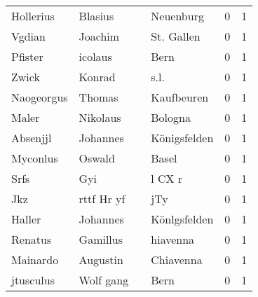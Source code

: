\begin{center}
\begin{tiny}
\begin{longtabu}{llllrr}
                Hollerius &                            Blasius &             &                                   Neuenburg &          0 &         1 \\
                   Vgdian &                            Joachim &             &                                  St. Gallen &          0 &         1 \\
                  Pfister &                            icolaus &             &                                        Bern &          0 &         1 \\
                    Zwick &                             Konrad &             &                                        s.l. &          0 &         1 \\
               Naogeorgus &                             Thomas &             &                                  Kaufbeuren &          0 &         1 \\
                    Maler &                           Nikolaus &             &                                     Bologna &          0 &         1 \\
                 Absenjjl &                           Johannes &             &                                Königsfelden &          0 &         1 \\
                 Myconlus &                             Oswald &             &                                       Basel &          0 &         1 \\
                     Srfs &                                Gyi &             &                                      l CX r &          0 &         1 \\
                      Jkz &                         rttf Hr yf &             &                                         jTy &          0 &         1 \\
                   Haller &                           Johannes &             &                                Könlgsfelden &          0 &         1 \\
                  Renatus &                           Gamillus &             &                                    hiavenna &          0 &         1 \\
                 Mainardo &                           Augustin &             &                                   Chiavenna &          0 &         1 \\
                jtusculus &                          Wolf gang &             &                                        Bern &          0 &         1 \\

\end{longtabu}
\end{tiny}
\end{center}
